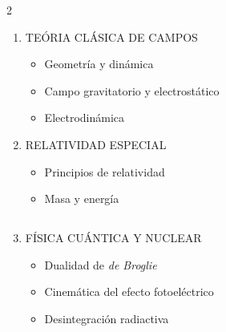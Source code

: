 \documentclass[a4paper,12pt]{extarticle}
\begin{document}
\begin{multicols}{2}
\begin{enumerate}
	 	
	 \subsection*{}

	 	\item  {\small TEÓRIA CLÁSICA DE CAMPOS}
	 		\begin{itemize}
	 			\item Geometría y dinámica 			
				\item Campo gravitatorio y electrostático
				\item Electrodinámica
			\end{itemize}
	\vspace{-1ex}

      
  
		 \item[\textbf{4\textonehalf}.] RELATIVIDAD ESPECIAL
      \begin{itemize}
        \item Principios de relatividad
		    \item Masa y energía
		  \end{itemize}

   	\vspace{-4ex}
   
			
\subsection*{}

		\item {\small FÍSICA CUÁNTICA Y NUCLEAR}
		  \begin{itemize}
		    \item Dualidad de \textit{de Broglie}
		    \item Cinemática del efecto fotoeléctrico								
		    \item Desintegración radiactiva
		  \end{itemize}
						
 \end{enumerate}
\end{multicols}
\end{document}
